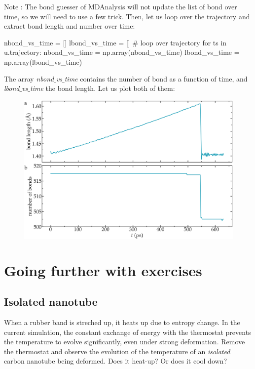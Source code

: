 \noindent Note : The bond guesser of MDAnalysis will not update the list of bond
over time, so we will need to use a few trick.
Then, let us loop over the trajectory and extract bond length and number
over time:

\begin{lcverbatim}
nbond_vs_time = []
lbond_vs_time = []
# loop over trajectory
for ts in u.trajectory:
nbond_vs_time = np.array(nbond_vs_time)
lbond_vs_time = np.array(lbond_vs_time)
\end{lcverbatim}

\noindent The array \textit{nbond$\_$vs$\_$time} contains the number of bond as a function of time, and 
\textit{lbond$\_$vs$\_$time} the bond length. Let us plot both of them:

\begin{figure}
\includegraphics[width=\linewidth]{tutorials/level1/breaking-a-carbon-nanotube/bond-light.png}
\end{figure}

\section{Going further with exercises}

\noindent \subsection{Isolated nanotube}

When a rubber band is streched up, it heats up due to entropy change. 
In the current simulation, the constant exchange of energy with the 
thermostat prevents the temperature to evolve significantly, even under
strong deformation.
Remove the thermostat and observe the evolution of the temperature of an
\textit{isolated} carbon nanotube being deformed. Does it heat-up? Or does it cool down?

